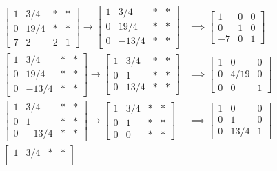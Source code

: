 \documentclass{article}
\begin{document}
\begin{enumerate}
\begin{soln}
\begin{align*}
				\begin{bmatrix}
					1 & 3/4 & * & * \\
					0 & 19/4 & * & * \\
					7 & 2 & 2 & 1
				\end{bmatrix} \to \begin{bmatrix}
					1 & 3/4 & * & * \\
					0 & 19/4 & * & * \\
					0 & -13/4 & * & * 
				\end{bmatrix} &\implies \begin{bmatrix}
					1 & 0 & 0 \\
					0 & 1 & 0 \\
					-7 & 0 & 1
				\end{bmatrix} \\
				\begin{bmatrix}
					1 & 3/4 & * & * \\
					0 & 19/4 & * & * \\
					0 & -13/4 & * & *
				\end{bmatrix} \to \begin{bmatrix}
					1 & 3/4 & * & * \\
					0 & 1 & * & * \\
					0 & 13/4 & * & *
				\end{bmatrix} &\implies \begin{bmatrix}
					1 & 0 & 0 \\
					0 & 4/19 & 0 \\
					0 & 0 & 1
				\end{bmatrix} \\
				\begin{bmatrix}
					1 & 3/4 & * & * \\
					0 & 1 & * & * \\
					0 & -13/4 & * & *
				\end{bmatrix} \to \begin{bmatrix}
					1 & 3/4 & * & * \\
					0 & 1 & * & * \\
					0 & 0 & * & *
				\end{bmatrix} &\implies \begin{bmatrix}
					1 & 0 & 0 \\
					0 & 1 & 0 \\
					0 & 13/4 & 1
				\end{bmatrix} \\
				\begin{bmatrix}
					1 & 3/4 & * & * \\

\end{bmatrix}
\end{align*}
\end{soln}
\end{enumerate}
\end{document}
